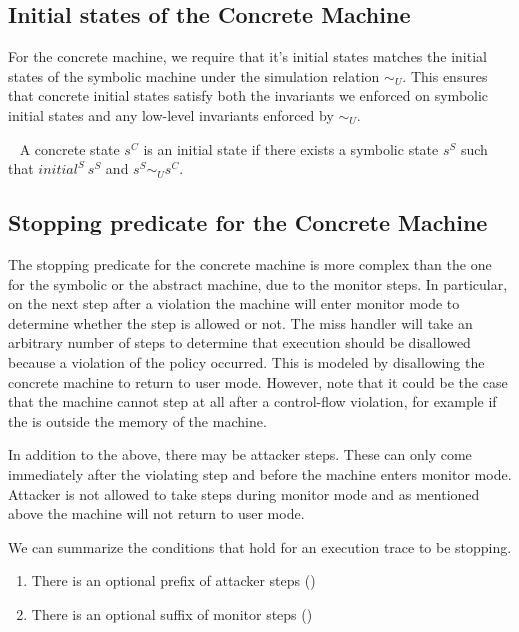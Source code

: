 \subsection{Initial states of the Concrete Machine}
\label{sec:concrete_initial}

For the concrete machine, we require that it's initial states matches
the initial states of the symbolic machine under the simulation
relation $\sim_U$. This ensures that concrete initial states satisfy
both the invariants we enforced on symbolic initial states and any
low-level invariants enforced by $\sim_U$.

\begin{definition}\label{concrete_initia_predl}
  ~ A concrete state $s^C$ is an initial state if there exists a
  symbolic state $s^S$ such that $initial^S ~ s^S$ and $s^S \sim_U
  s^C$.
\end{definition}

\subsection{Stopping predicate for the Concrete Machine}
\label{sec:concrete_stopping}

The stopping predicate for the concrete machine is more complex than
the one for the symbolic or the abstract machine, due to the monitor
steps. In particular, on the next step after a violation the machine
will enter monitor mode to determine whether the step is allowed or
not. The miss handler will take an arbitrary number of steps to
determine that execution should be disallowed because a violation of
the policy occurred. This is modeled by disallowing the concrete
machine to return to user mode.  However, note that it could be the
case that the machine cannot step at all after a control-flow
violation, for example if the \pc is outside the memory of the machine.

In addition to the above, there may be attacker steps. These can only
come immediately after the violating step and before the machine
enters monitor mode. Attacker is not allowed to take steps during
monitor mode and as mentioned above the machine will not return to
user mode.

We can summarize the conditions that hold for an execution trace to
be stopping.

\begin{enumerate}
\item There is an optional prefix of attacker steps (\stepa{}{}{})
\item There is an optional suffix of monitor steps (\stepn{}{})
\end{enumerate}

